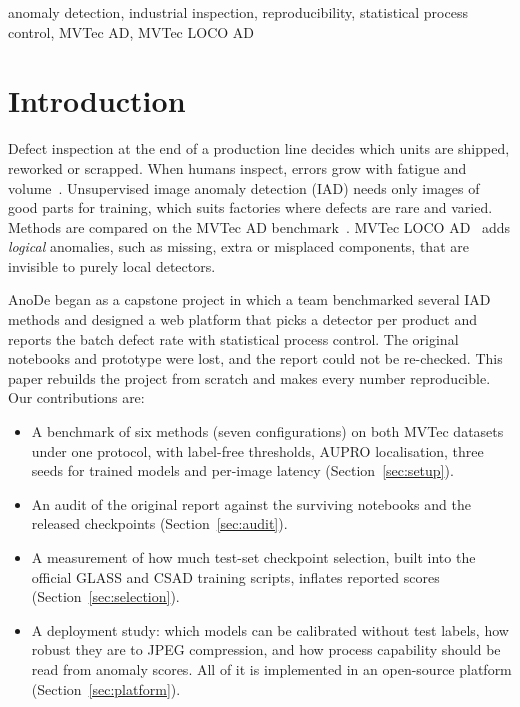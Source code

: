\documentclass[conference]{IEEEtran}
\begin{document}
\begin{IEEEkeywords}
anomaly detection, industrial inspection, reproducibility, statistical process control, MVTec AD, MVTec LOCO AD
\end{IEEEkeywords}

\section{Introduction}

Defect inspection at the end of a production line decides which units are shipped, reworked or scrapped. When
humans inspect, errors grow with fatigue and volume~\cite{liu2024survey}. Unsupervised image anomaly detection
(IAD) needs only images of good parts for training, which suits factories where defects are rare and varied.
Methods are compared on the MVTec AD benchmark~\cite{bergmann2019mvtec,bergmann2021mvtec}. MVTec LOCO
AD~\cite{bergmann2022loco} adds \emph{logical} anomalies, such as missing, extra or misplaced components, that
are invisible to purely local detectors.

AnoDe began as a capstone project in which a team benchmarked several IAD methods and designed a web platform that
picks a detector per product and reports the batch defect rate with statistical process control. The original
notebooks and prototype were lost, and the report could not be re-checked. This paper rebuilds the project from
scratch and makes every number reproducible. Our contributions are:

\begin{itemize}
\item A benchmark of six methods (seven configurations) on both MVTec datasets under one protocol, with
label-free thresholds, AUPRO localisation, three seeds for trained models and per-image latency
(Section~\ref{sec:setup}).
\item An audit of the original report against the surviving notebooks and the released checkpoints
(Section~\ref{sec:audit}).
\item A measurement of how much test-set checkpoint selection, built into the official GLASS and CSAD training
scripts, inflates reported scores (Section~\ref{sec:selection}).
\item A deployment study: which models can be calibrated without test labels, how robust they are to JPEG
compression, and how process capability should be read from anomaly scores. All of it is implemented in an
open-source platform (Section~\ref{sec:platform}).
\end{itemize}
\end{document}
